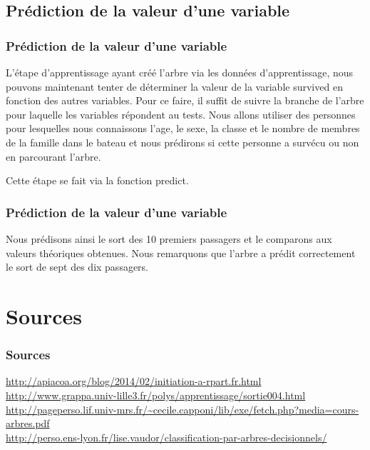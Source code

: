 \documentclass[compress]{beamer}
\begin{document}
\subsection{Prédiction de la valeur d'une variable}
\begin{frame}
\frametitle{Prédiction de la valeur d'une variable}
L'étape d'apprentissage ayant créé l'arbre via les données d'apprentissage, nous pouvons maintenant tenter de déterminer la valeur de la variable \textrm{survived}
en fonction des autres variables. Pour ce faire, il suffit de suivre la branche de l'arbre pour laquelle les variables répondent au tests.\newline
 Nous allons utiliser des personnes pour lesquelles nous connaissons l'age, le sexe, la classe et le nombre de membres de la famille dans le bateau et nous prédirons
 si cette personne a survécu ou non en parcourant l'arbre.\newline

Cette étape se fait via la fonction \textrm{predict}. \newline
 
\end{frame}
\begin{frame}
\frametitle{Prédiction de la valeur d'une variable}
 

Nous prédisons ainsi le sort des 10 premiers passagers et le comparons aux valeurs théoriques obtenues. Nous remarquons que l'arbre a prédit correctement le sort
de sept des dix passagers.
\end{frame}

\section*{Sources}
\begin{frame}
\frametitle{Sources}
\url{http://apiacoa.org/blog/2014/02/initiation-a-rpart.fr.html}\\
\url{http://www.grappa.univ-lille3.fr/polys/apprentissage/sortie004.html}\\
\url{http://pageperso.lif.univ-mrs.fr/~cecile.capponi/lib/exe/fetch.php?media=cours-arbres.pdf}\\
\url{http://perso.ens-lyon.fr/lise.vaudor/classification-par-arbres-decisionnels/}
\end{frame}
\end{document}
